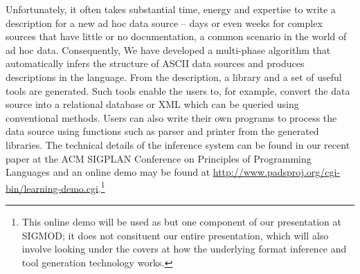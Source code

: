 \documentclass{sig-alternate-sigmod08}
\begin{document}
Unfortunately, it often takes substantial time, energy and expertise
to write a \pads{} description for a new ad hoc data source
-- days or even weeks for complex sources that have little or
no documentation, a common scenario in the world of ad hoc data.
Consequently, We have developed a multi-phase algorithm that automatically
infers the structure of ASCII data sources and produces descriptions
in the \pads{} language. From the \pads{} description, a library and a
set of useful tools are generated. Such tools enable the users to, for example, 
convert the data source into a relational database or XML which can 
be queried using conventional methods. Users can also write their 
own programs to process the data source using
functions such as parser and printer from the generated libraries.
The technical details of the inference system can be found in our recent
paper at the ACM SIGPLAN Conference on Principles of Programming
Languages\cite{Fisher+:dirttoshovels} and an online demo may be found
at \url{http://www.padsproj.org/cgi-bin/learning-demo.cgi}.\footnote{This 
online demo will be used as but one component of our presentation at SIGMOD;  
it does not consituent our entire presentation, which will also involve looking
under the covers at how the underlying format inference and tool generation
technology works.}


\end{document}
